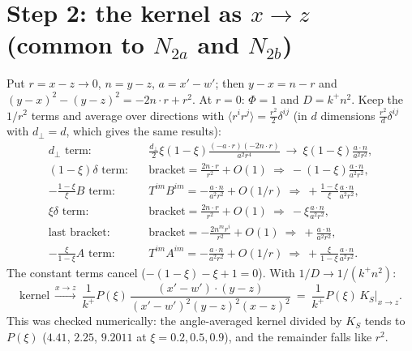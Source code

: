 \documentclass[10pt]{article}
\numberwithin{equation}{section}
\begin{document}
\section{Step 2: the kernel as $x\to z$ (common to $N_{2a}$ and $N_{2b}$)}
Put $r=x-z\to0$, $n=y-z$, $a=x'-w'$; then $y-x=n-r$ and $(y-x)^{2}-(y-z)^{2}=-2n\cdot r+r^{2}$. At $r=0$: $\Phi=1$ and $D=k^{+}n^{2}$. Keep the $1/r^{2}$ terms and average over directions with $\langle r^{i}r^{j}\rangle=\frac{r^{2}}{2}\delta^{ij}$ (in $d$ dimensions $\frac{r^{2}}{d}\delta^{ij}$ with $d_{\perp}=d$, which gives the same results):
\begin{align}
\text{$d_{\perp}$ term:}\quad&\frac{d_{\perp}}{2}\xi(1-\xi)\frac{(-a\cdot r)(-2n\cdot r)}{a^{2}r^{4}}\ \to\ \xi(1-\xi)\frac{a\cdot n}{a^{2}r^{2}},\\
\text{$(1-\xi)\delta$ term:}\quad&\text{bracket}=\frac{2n\cdot r}{r^{2}}+O(1)\ \Rightarrow\ -(1-\xi)\frac{a\cdot n}{a^{2}r^{2}},\\
\text{$-\tfrac{1-\xi}{\xi}B$ term:}\quad&T^{im}B^{im}=-\frac{a\cdot n}{a^{2}r^{2}}+O(1/r)\ \Rightarrow\ +\frac{1-\xi}{\xi}\frac{a\cdot n}{a^{2}r^{2}},\\
\text{$\xi\delta$ term:}\quad&\text{bracket}=\frac{2n\cdot r}{r^{2}}+O(1)\ \Rightarrow\ -\xi\frac{a\cdot n}{a^{2}r^{2}},\\
\text{last bracket:}\quad&\text{bracket}=-\frac{2n^{m}r^{i}}{r^{2}}+O(1)\ \Rightarrow\ +\frac{a\cdot n}{a^{2}r^{2}},\\
\text{$-\tfrac{\xi}{1-\xi}A$ term:}\quad&T^{im}A^{im}=-\frac{a\cdot n}{a^{2}r^{2}}+O(1/r)\ \Rightarrow\ +\frac{\xi}{1-\xi}\frac{a\cdot n}{a^{2}r^{2}}.
\end{align}
The constant terms cancel ($-(1-\xi)-\xi+1=0$). With $1/D\to1/(k^{+}n^{2})$:
\begin{equation}
\text{kernel}\ \xrightarrow{x\to z}\ \frac{1}{k^{+}}P(\xi)\,\frac{(x'-w')\cdot(y-z)}{(x'-w')^{2}(y-z)^{2}(x-z)^{2}}\ =\ \frac{1}{k^{+}}P(\xi)\,K_{S}\Big|_{x\to z}.
\label{eq:limit}
\end{equation}
This was checked numerically: the angle-averaged kernel divided by $K_{S}$ tends to $P(\xi)$ ($4.41$, $2.25$, $9.2011$ at $\xi=0.2,0.5,0.9$), and the remainder falls like $r^{2}$.
\end{document}
